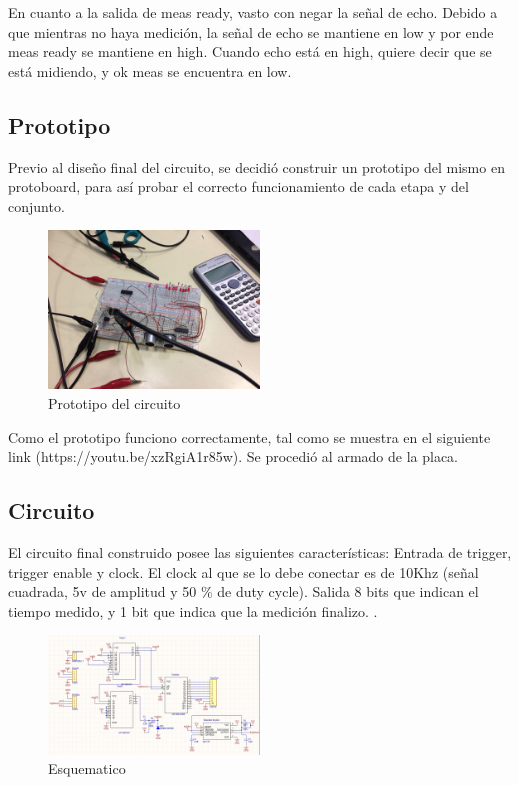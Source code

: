 \documentclass[../../e3_tp2_main.tex]{subfiles}
\begin{document}
En cuanto a la salida de meas ready, vasto con negar la señal de echo. Debido a que mientras no haya medición, la señal de echo se mantiene en low y por ende meas ready se mantiene en high. Cuando echo está en high, quiere decir que se está midiendo, y ok meas se encuentra en low.
\subsection{Prototipo}
Previo al diseño final del circuito, se decidió construir un prototipo del mismo en protoboard, para así probar el correcto funcionamiento de cada etapa y del conjunto. 
\begin{figure}[H]	
	\centering
	\includegraphics[angle=180,width=0.5\textwidth]{imagenes/prototipo.jpeg}
	\caption{Prototipo del circuito}
\end{figure}
Como el prototipo funciono correctamente, tal como se muestra en el siguiente link (https://youtu.be/xzRgiA1r85w). Se procedió al armado de la placa.
\subsection{Circuito}

El circuito final construido posee las siguientes características:
Entrada de trigger, trigger enable y clock. El clock al que se lo debe conectar es de 10Khz (señal cuadrada, 5v de amplitud y 50 \% de duty cycle).
Salida 8 bits que indican el tiempo medido, y 1 bit que indica que la medición finalizo.
.
\begin{figure}[H]	
	\centering
	\includegraphics[width=0.5\textwidth]{imagenes/esquematico.png}
	\caption{Esquematico}
\end{figure}
\end{document}
